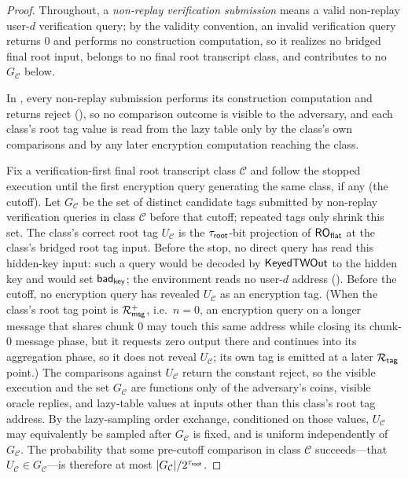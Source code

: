 \begin{proof}
Throughout, a \emph{non-replay verification submission} means a valid
non-replay user-$d$ verification query; by the validity convention, an
invalid verification query returns $0$ and performs no construction
computation, so it realizes no bridged final root input, belongs to no
final root transcript class, and contributes to no $G_{\mathcal{C}}$
below.

In \Grej{}, every non-replay submission performs its construction
computation and returns reject (), so
no comparison outcome is visible to the adversary, and each class's
root tag value is read from the lazy table only by the class's own
comparisons and by any later encryption computation reaching the class.

Fix a verification-first final root transcript class $\mathcal{C}$ and
follow the stopped execution until the first encryption query
generating the same class, if any (the cutoff). Let $G_{\mathcal{C}}$
be the set of distinct candidate tags submitted by non-replay
verification queries in class $\mathcal{C}$ before that cutoff;
repeated tags only shrink this set. The class's correct root tag
$U_{\mathcal{C}}$ is the $\tau_{\mathsf{root}}$-bit projection of $\mathsf{RO}_{\mathsf{flat}}$ at the
class's bridged root tag input. Before the stop, no direct query has
read this hidden-key input: such a query would be decoded by
$\mathsf{KeyedTWOut}$ to the hidden key and would set $\mathsf{bad}_{\mathsf{key}}$; the
environment reads no user-$d$ address ().
Before the cutoff, no encryption query has revealed $U_{\mathcal{C}}$
as an encryption tag. (When the class's root tag point is $\mathcal{R}_{\mathsf{msg}}^+$,
i.e.\ $n = 0$, an encryption query on a longer message that shares
chunk $0$ may touch this same address while closing its chunk-$0$
message phase, but it requests zero output there and continues into its
aggregation phase, so it does not reveal $U_{\mathcal{C}}$; its own tag
is emitted at a later $\mathcal{R}_{\mathsf{tag}}$ point.) The comparisons against
$U_{\mathcal{C}}$ return the constant reject, so the visible execution
and the set $G_{\mathcal{C}}$ are functions only of the adversary's
coins, visible oracle replies, and lazy-table values at inputs other
than this class's root tag address. By the lazy-sampling order
exchange, conditioned on those values, $U_{\mathcal{C}}$ may
equivalently be sampled after $G_{\mathcal{C}}$ is fixed, and is
uniform independently of $G_{\mathcal{C}}$. The probability that some
pre-cutoff comparison in class $\mathcal{C}$ succeeds---that
$U_{\mathcal{C}} \in G_{\mathcal{C}}$---is therefore at most
$|G_{\mathcal{C}}|/2^{\tau_{\mathsf{root}}}$.


\end{proof}
